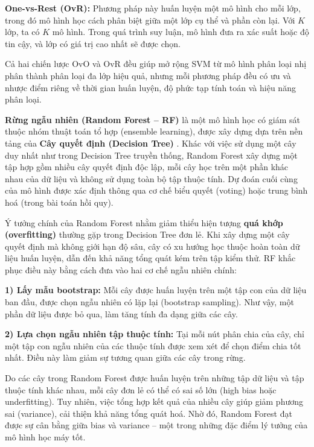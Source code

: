 \textbf{One-vs-Rest (OvR):} Phương pháp này huấn luyện một mô hình cho 
mỗi lớp, trong đó mô hình học cách phân biệt giữa một lớp cụ thể và 
phần còn lại. Với $K$ lớp, ta có $K$ mô hình. Trong quá trình suy luận, 
mô hình đưa ra xác suất hoặc độ tin cậy, và lớp có giá trị cao nhất 
sẽ được chọn.

Cả hai chiến lược OvO và OvR đều giúp mở rộng SVM từ mô hình phân loại 
nhị phân thành phân loại đa lớp hiệu quả, nhưng mỗi phương pháp đều có 
ưu và nhược điểm riêng về thời gian huấn luyện, độ phức tạp tính toán 
và hiệu năng phân loại.



\textbf{Rừng ngẫu nhiên (Random Forest – RF)} là một mô hình học có 
giám sát thuộc nhóm thuật toán tổ hợp (ensemble learning), 
được xây dựng dựa trên nền tảng của 
\textbf{Cây quyết định (Decision Tree)} \cite{breiman2001random}. 
Khác với việc sử dụng một cây duy nhất như trong Decision Tree 
truyền thống, Random Forest xây dựng một tập hợp gồm nhiều cây 
quyết định độc lập, mỗi cây học trên một phần khác nhau của dữ liệu và 
không sử dụng toàn bộ tập thuộc tính. Dự đoán cuối cùng của mô hình 
được xác định thông qua cơ chế biểu quyết (voting) hoặc trung bình hoá 
(trong bài toán hồi quy).

Ý tưởng chính của Random Forest nhằm giảm thiểu hiện tượng 
\textbf{quá khớp (overfitting)} thường gặp trong Decision Tree đơn lẻ. 
Khi xây dựng một cây quyết định mà không giới hạn độ sâu, 
cây có xu hướng học thuộc hoàn toàn dữ liệu huấn luyện, 
dẫn đến khả năng tổng quát kém trên tập kiểm thử. 
RF khắc phục điều này bằng cách đưa vào hai cơ chế ngẫu nhiên chính:

\vspace{0.5em}
\noindent\textbf{1) Lấy mẫu bootstrap:} Mỗi cây được huấn luyện trên 
một tập con của dữ liệu ban đầu, được chọn ngẫu nhiên có lặp lại 
(bootstrap sampling). Như vậy, một phần dữ liệu được bỏ qua, 
làm tăng tính đa dạng giữa các cây.

\vspace{0.5em}
\noindent\textbf{2) Lựa chọn ngẫu nhiên tập thuộc tính:} Tại mỗi nút 
phân chia của cây, chỉ một tập con ngẫu nhiên của các thuộc tính được 
xem xét để chọn điểm chia tốt nhất. Điều này làm giảm sự tương quan 
giữa các cây trong rừng.

Do các cây trong Random Forest được huấn luyện trên những tập dữ liệu 
và tập thuộc tính khác nhau, mỗi cây đơn lẻ có thể có sai số lớn 
(high bias hoặc underfitting). Tuy nhiên, việc tổng hợp kết quả của 
nhiều cây giúp giảm phương sai (variance), cải thiện khả năng tổng 
quát hoá. Nhờ đó, Random Forest đạt được sự cân bằng giữa bias và 
variance – một trong những đặc điểm lý tưởng của mô hình học máy tốt.

